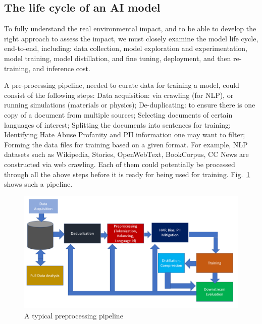 {    \subsection{The life cycle of an AI model}
    {
        \label{life-cycle}

        To fully understand the real environmental impact, and to be able to develop the right approach to assess the impact, we must closely examine the model life cycle, end-to-end, including: data collection, model exploration and experimentation, model training, model distillation, and fine tuning, deployment, and then re-training, and inference cost.

        A pre-processing pipeline, needed to curate data for training a model, could consist of the following steps: Data acquisition: via crawling (for NLP), or running simulations (materials or physics); De-duplicating:  to ensure there is one copy of a document from multiple sources; Selecting documents of certain languages of interest; Splitting the documents into sentences for training; Identifying Hate Abuse Profanity and PII information one may want to filter; Forming the data files for training based on a given format. For example, NLP datasets such as Wikipedia, Stories, OpenWebText, BookCorpus, CC News are constructed via web crawling. Each of them could potentially be processed through all the above steps before it is ready for being used for training. Fig.~\ref{fig:model-preprocess} shows such a pipeline.

        \begin{figure}[!t]
            \centering
            \includegraphics[trim = {0.3in 1.0in 0.8in 0.6in}, clip, width = \linewidth]{Figures/sustain3.png}
            \caption{A typical preprocessing pipeline}
            \label{fig:model-preprocess}
        \end{figure}

}}
